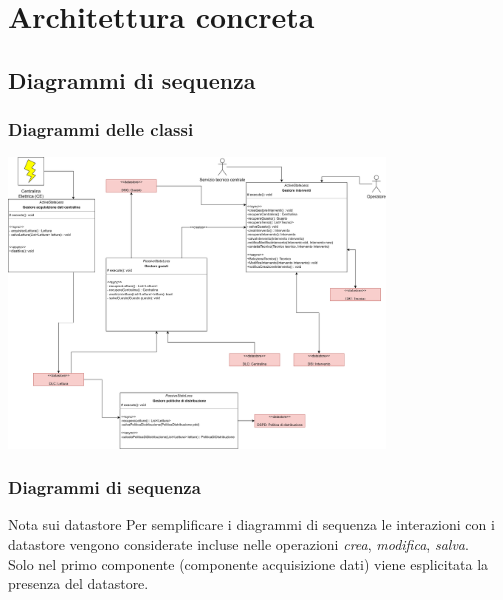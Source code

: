 \documentclass{beamer}
\begin{document}
	\section{Architettura concreta}
	
	\subsection{Diagrammi di sequenza}
	
\begin{frame}
	\frametitle{Diagrammi delle classi}
		\begin{center}
			\includegraphics[width=0.75\textwidth, height=0.75\textheight, keepaspectratio=true]{diagramma_classi.png}
		\end{center}
\end{frame}

\begin{frame}
	\frametitle{Diagrammi di sequenza}
	\begin{center}
		\begin{block}{Nota sui datastore}
			Per semplificare i diagrammi di sequenza le interazioni con i datastore vengono considerate incluse nelle operazioni
			\textit{crea}, \textit{modifica}, \textit{salva}. \\
			Solo nel primo componente (componente acquisizione dati) viene esplicitata la presenza del datastore.
		\end{block}
	\end{center}
\end{frame}
\end{document}
